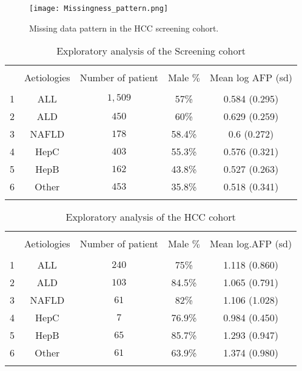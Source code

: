 \documentclass[11pt,twoside]{article}
\numberwithin{Theorem}{section}
\numberwithin{Definition}{section}
\numberwithin{Lemma}{section}
\numberwithin{Algorithm}{section}
\numberwithin{equation}{section}
\begin{document}
%
\begin{figure}[h!]
    \centering
    \texttt{[image: Missingness\_pattern.png]}
    \caption{Missing data pattern in the HCC screening cohort.}
    \label{fig:miss_data}
\end{figure}
\clearpage
\begin{table}[h!] \centering
  \caption{Exploratory analysis of the Screening cohort}
  \label{table:explor1}
\begin{tabular}{@{\extracolsep{5pt}} ccccc}
\\[-1.8ex]\hline
\hline \\[-1.8ex]
 & Aetiologies & Number of patient & Male $\%$ & Mean log AFP  (sd) \\
\hline \\[-1.8ex]
1 & ALL & $1,509$ & 57\% & 0.584 (0.295) \\
2 & ALD & $450$ & 60\% & 0.629 (0.259) \\
3 & NAFLD & $178$ & 58.4\% & 0.6 (0.272) \\
4 & HepC & $403$ & 55.3\% & 0.576 (0.321) \\
5 & HepB & $162$ & 43.8\% & 0.527 (0.263) \\
6 & Other & $453$ & 35.8\% & 0.518 (0.341) \\
\hline \\[-1.8ex]
\end{tabular}
\end{table}
%
\begin{table}[!htbp] \centering
  \caption{Exploratory analysis of the HCC cohort}
  \label{table:explor2}
\begin{tabular}{@{\extracolsep{5pt}} ccccc}
\\[-1.8ex]\hline
\hline \\[-1.8ex]
 & Aetiologies & Number of patient & Male $\%$ & Mean log.AFP (sd) \\
\hline \\[-1.8ex]
1 & ALL & $240$ & 75\% & 1.118 (0.860) \\
2 & ALD & $103$ & 84.5\% & 1.065 (0.791) \\
3 & NAFLD & $61$ & 82\% & 1.106 (1.028) \\
4 & HepC & $7$ & 76.9\% & 0.984 (0.450) \\
5 & HepB & $65$ & 85.7\% & 1.293 (0.947) \\
6 & Other & $61$ & 63.9\% & 1.374 (0.980) \\
\hline \\[-1.8ex]
\end{tabular}
\end{table}
%
%
\end{document}
